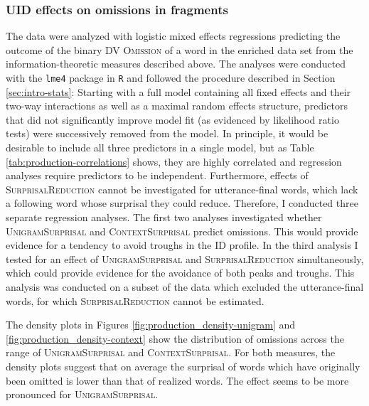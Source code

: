 \subsubsection{UID effects on omissions in fragments}
\label{sec:scripts-production-results-surprisal}

The data were analyzed with logistic mixed effects regressions predicting the outcome of the binary DV \textsc{Omission} of a word in the enriched data set from the information-theoretic measures described above. The analyses were conducted with the \texttt{lme4} package \citep{bates.etal2015} in \texttt{R} and followed the procedure described in Section \ref{sec:intro-stats}: Starting with a full model containing all fixed effects and their two-way interactions as well as a maximal random effects structure, predictors that did not significantly improve model fit (as evidenced by likelihood ratio tests) were successively removed from the model. In principle, it would be desirable to include all three predictors in a single model, but as Table \ref{tab:production-correlations} shows, they are highly correlated and regression analyses require predictors to be independent. Furthermore, effects of \textsc{SurprisalReduc\-tion} cannot be investigated for utterance-final words, which lack a following word whose surprisal they could reduce. Therefore, I conducted three separate regression analyses. The first two analyses investigated whether \textsc{UnigramSurpri\-sal} and \textsc{ContextSurprisal} predict omissions. This would provide evidence for a tendency to avoid troughs in the ID profile. In the third analysis I tested for an effect of \textsc{UnigramSurprisal} and \textsc{SurprisalReduction} simultaneously, which could provide evidence for the avoidance of both peaks and troughs. This analysis was conducted on a subset of the data which excluded the utterance-final words, for which \textsc{SurprisalReduction} cannot be estimated.

The density plots in Figures \ref{fig:production_density-unigram} and \ref{fig:production_density-context}  show the distribution of omissions across the range of \textsc{UnigramSurprisal} and \textsc{ContextSurprisal}. For both measures, the density plots suggest that on average the surprisal of words which have originally been omitted is lower than that of realized words. The effect seems to be more pronounced for \textsc{UnigramSurprisal}. 


